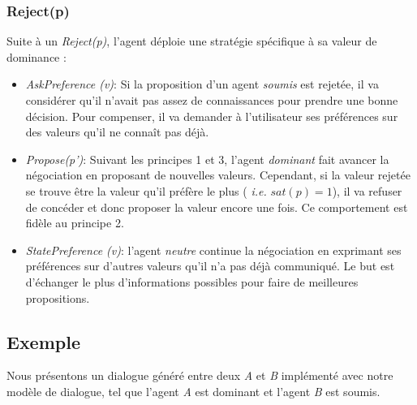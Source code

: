	\subsubsection{Reject(p)}
	
	Suite à un \emph{Reject(p)}, l'agent déploie une stratégie spécifique à sa valeur de dominance :
	\begin{itemize}
		\item \emph{AskPreference (v)}: Si la proposition d'un agent \emph{soumis} est rejetée, il va considérer qu'il n'avait pas assez de connaissances pour prendre une bonne décision. Pour compenser, il va demander à l'utilisateur ses préférences sur des valeurs qu'il ne connaît pas déjà. 
		
		\item \emph{Propose(p')}: Suivant les principes 1 et 3, l'agent \emph{dominant} fait avancer la négociation en proposant de nouvelles valeurs. Cependant, si la valeur rejetée se trouve être la valeur qu'il préfère le plus ( \textit{i.e.} $sat(p) =1$), il va refuser de concéder et donc proposer la valeur encore une fois. Ce comportement est fidèle au principe 2. 
		
		\item \emph{StatePreference (v)}: l'agent \emph{neutre} continue la négociation en exprimant ses préférences sur d'autres valeurs qu'il n'a pas déjà communiqué. Le but est d'échanger le plus d'informations possibles pour faire de meilleures propositions. 
	\end{itemize}	
	
	\subsection{Exemple}
	Nous présentons un dialogue généré entre deux \textit{A} et \textit{B} implémenté avec notre modèle de dialogue, tel que l'agent \textit{A} est dominant et l'agent \textit{B} est soumis. 


